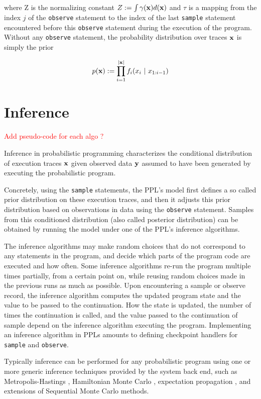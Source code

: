 where Z is the normalizing constant $Z := \int{\gamma(\ensuremath{\boldsymbol{\mathbf{x}}}) d(\ensuremath{\boldsymbol{\mathbf{x}}})}$ and $\tau$ is a mapping from the index $j$ of the \texttt{observe} statement to the index of the last \texttt{sample} statement encountered before this \texttt{observe} statement during the execution of the program. Without any \texttt{observe} statement, the probability distribution over traces $\boldsymbol{\mathbf{x}}$ is simply the prior

\begin{equation*}
p(\boldsymbol{\mathbf{x}}) := \prod_{i=1}^{|\boldsymbol{\mathbf{x}}|}{f_{i}(x_i~|~x_{1:i-1})}
\end{equation*}

\section{Inference}
\textcolor{red}{Add pseudo-code for each algo ?}

Inference in probabilistic programming characterizes the conditional distribution of execution traces $\boldsymbol{\mathbf{x}}$ given observed data $\boldsymbol{\mathbf{y}}$ assumed to have been generated by executing the probabilistic program.

Concretely, using the \texttt{sample} statements, the \gls{PPL}'s model first defines a so called prior distribution on these execution traces, and then it adjusts this prior distribution based on observations in data using the \texttt{observe} statement. Samples from this conditioned distribution (also called posterior distribution) can be obtained by running the model under one of the \gls{PPL}’s inference algorithms.


The inference algorithms may make random choices that do not correspond to any statements in the program, and decide which parts of the program code are executed and how often. Some inference algorithms re-run the program multiple times partially, from a certain point on, while reusing random choices made in the previous runs as much as possible.
Upon encountering a sample or observe record, the inference algorithm computes the updated program state and the value to be passed to the continuation. How the state is updated, the number of times the continuation is called, and the value passed to the continuation of sample depend on the inference algorithm executing the program.
Implementing an inference algorithm in \gls{PPL}s amounts to defining 
checkpoint handlers for \texttt{sample} and \texttt{observe}.

Typically inference can be performed for any probabilistic program using one or more generic inference techniques provided by the system back end, such as Metropolis-Hastings \cite{Wingate:2011ul, Mansinghka:2014ty}, Hamiltonian Monte Carlo \cite{Stan}, expectation propagation \cite{InferNET}, and extensions of Sequential Monte Carlo \cite{vandeMeent:2015uk, Paige:2014tc, Wood:2015tr} methods.

